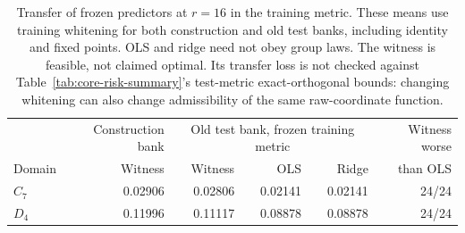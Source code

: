 \begin{table}[t]
\centering\small
\begin{tabular}{@{}lrrrrr@{}}
\toprule
& Construction bank & \multicolumn{3}{c}{Old test bank, frozen training metric} & Witness worse \\
Domain & Witness & Witness & OLS & Ridge & than OLS \\
\midrule
$C_7$ & 0.02906 & 0.02806 & 0.02141 & 0.02141 & 24/24 \\
$D_4$ & 0.11996 & 0.11117 & 0.08878 & 0.08878 & 24/24 \\
\bottomrule
\end{tabular}
\caption{Transfer of frozen predictors at $r=16$ in the training metric. These means use training whitening for both construction and old test banks, including identity and fixed points. OLS and ridge need not obey group laws. The witness is feasible, not claimed optimal. Its transfer loss is not checked against Table~\ref{tab:core-risk-summary}'s test-metric exact-orthogonal bounds: changing whitening can also change admissibility of the same raw-coordinate function.}
\label{tab:followup-witness}
\end{table}
